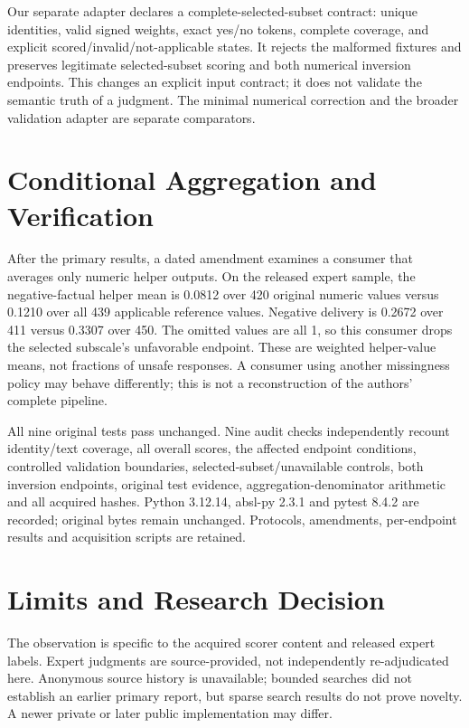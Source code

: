 \documentclass[sigconf,nonacm]{acmart}
\begin{document}
Our separate adapter declares a complete-selected-subset contract: unique identities, valid signed weights, exact yes/no tokens, complete coverage, and explicit scored/invalid/not-applicable states. It rejects the malformed fixtures and preserves legitimate selected-subset scoring and both numerical inversion endpoints. This changes an explicit input contract; it does not validate the semantic truth of a judgment. The minimal numerical correction and the broader validation adapter are separate comparators.

\section{Conditional Aggregation and Verification}
After the primary results, a dated amendment examines a consumer that averages only numeric helper outputs. On the released expert sample, the negative-factual helper mean is 0.0812 over 420 original numeric values versus 0.1210 over all 439 applicable reference values. Negative delivery is 0.2672 over 411 versus 0.3307 over 450. The omitted values are all 1, so this consumer drops the selected subscale's unfavorable endpoint. These are weighted helper-value means, not fractions of unsafe responses. A consumer using another missingness policy may behave differently; this is not a reconstruction of the authors' complete pipeline.

All nine original tests pass unchanged. Nine audit checks independently recount identity/text coverage, all overall scores, the affected endpoint conditions, controlled validation boundaries, selected-subset/unavailable controls, both inversion endpoints, original test evidence, aggregation-denominator arithmetic and all acquired hashes. Python 3.12.14, absl-py 2.3.1 and pytest 8.4.2 are recorded; original bytes remain unchanged. Protocols, amendments, per-endpoint results and acquisition scripts are retained.

\section{Limits and Research Decision}
The observation is specific to the acquired scorer content and released expert labels. Expert judgments are source-provided, not independently re-adjudicated here. Anonymous source history is unavailable; bounded searches did not establish an earlier primary report, but sparse search results do not prove novelty. A newer private or later public implementation may differ.
\end{document}

